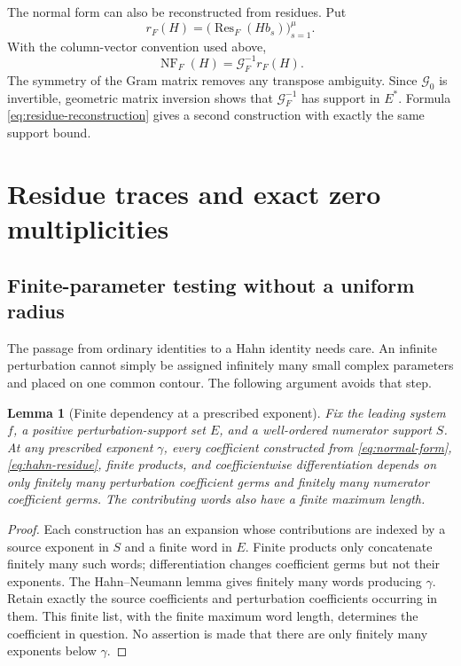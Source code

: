 \documentclass[11pt,letterpaper]{article}
\newtheorem{lemma}[lemma]{Lemma}
\theoremstyle{definition}
\theoremstyle{remark}
\newcommand{\Res}{\operatorname{Res}}
\newcommand{\NF}{\operatorname{NF}}
\numberwithin{equation}{section}
\begin{document}
The normal form can also be reconstructed from residues. Put
\[
 r_F(H)=\bigl(\Res_F(Hb_s)\bigr)_{s=1}^\mu.
\]
With the column-vector convention used above,
\begin{equation}\label{eq:residue-reconstruction}
 \NF_F(H)=\mathcal G_F^{-1}r_F(H).
\end{equation}
The symmetry of the Gram matrix removes any transpose ambiguity. Since $\mathcal G_0$ is invertible, geometric matrix inversion shows that $\mathcal G_F^{-1}$ has support in $E^*$. Formula \eqref{eq:residue-reconstruction} gives a second construction with exactly the same support bound.

\section{Residue traces and exact zero multiplicities}\label{sec:trace}

\subsection{Finite-parameter testing without a uniform radius}
The passage from ordinary identities to a Hahn identity needs care. An infinite perturbation cannot simply be assigned infinitely many small complex parameters and placed on one common contour. The following argument avoids that step.

\begin{lemma}[Finite dependency at a prescribed exponent]\label{lem:finite-dependency}
Fix the leading system $f$, a positive perturbation-support set $E$, and a well-ordered numerator support $S$. At any prescribed exponent $\gamma$, every coefficient constructed from \eqref{eq:normal-form}, \eqref{eq:hahn-residue}, finite products, and coefficientwise differentiation depends on only finitely many perturbation coefficient germs and finitely many numerator coefficient germs. The contributing words also have a finite maximum length.
\end{lemma}
\begin{proof}
Each construction has an expansion whose contributions are indexed by a source exponent in $S$ and a finite word in $E$. Finite products only concatenate finitely many such words; differentiation changes coefficient germs but not their exponents. The Hahn--Neumann lemma gives finitely many words producing $\gamma$. Retain exactly the source coefficients and perturbation coefficients occurring in them. This finite list, with the finite maximum word length, determines the coefficient in question. No assertion is made that there are only finitely many exponents below $\gamma$.
\end{proof}
\end{document}
